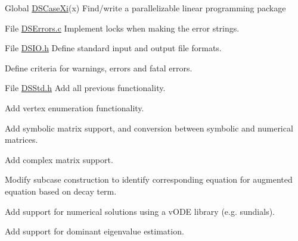 \label{todo__todo000001}
\hypertarget{todo__todo000001}{}
 
\begin{DoxyDescription}
\item[Global \hyperlink{_d_s_case_linear_programming_8c_ae1ae8cfc064c0d32e4f4d48686b774cf}{DSCaseXi}(x) ]Find/write a parallelizable linear programming package 
\end{DoxyDescription}

\label{todo__todo000003}
\hypertarget{todo__todo000003}{}
 
\begin{DoxyDescription}
\item[File \hyperlink{_d_s_errors_8c}{DSErrors.c} ]Implement locks when making the error strings. 
\end{DoxyDescription}

\label{todo__todo000004}
\hypertarget{todo__todo000004}{}
 
\begin{DoxyDescription}
\item[File \hyperlink{_d_s_i_o_8h}{DSIO.h} ]Define standard input and output file formats. 

Define criteria for warnings, errors and fatal errors.


\end{DoxyDescription}

\label{todo__todo000005}
\hypertarget{todo__todo000005}{}
 
\begin{DoxyDescription}
\item[File \hyperlink{_d_s_std_8h}{DSStd.h} ]Add all previous functionality. 

Add vertex enumeration functionality. 

Add symbolic matrix support, and conversion between symbolic and numerical matrices. 

Add complex matrix support. 

Modify subcase construction to identify corresponding equation for augmented equation based on decay term. 

Add support for numerical solutions using a vODE library (e.g. sundials). 

Add support for dominant eigenvalue estimation.


\end{DoxyDescription}
